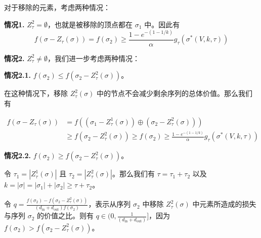 对于移除的元素，考虑两种情况：

\textbf{情况1.} $Z^2_{\tau}=\emptyset$，也就是被移除的顶点都在 $\sigma_1$ 中。因此有
\begin{equation}
    f(\sigma-Z_\tau(\sigma))=f(\sigma_2) \ge \frac{1-e^{-(1-1/k)}}{\alpha} g_\tau(\sigma^*(V,k,\tau))
\end{equation}

\textbf{情况2.} $Z^2_{\tau} \neq \emptyset$，我们进一步考虑两种情况：

\textbf{情况2.1.} $f(\sigma_2) \le f(\sigma_2 - Z^2_\tau(\sigma))$。

在这种情况下，移除 $Z^2_\tau(\sigma)$ 中的节点不会减少剩余序列的总体价值。那么我们有

\begin{align}
f(\sigma-Z_\tau(\sigma)) & = f((\sigma_1 - Z_\tau^1(\sigma)) \oplus (\sigma_2 - Z_\tau^2(\sigma))) \\
& \ge f(\sigma_2 -Z_\tau^2(\sigma)) \ge f(\sigma_2) \ge \frac{1-e^{-(1-1/k)}}{\alpha} g_\tau(\sigma^*(V,k,\tau))
\end{align}

\textbf{情况2.2.}  $f(\sigma_2) \ge f(\sigma_2 - Z^2_\tau(\sigma))$。

令 $\tau_1 = |Z_\tau^1(\sigma)|$ 且 $\tau_2=|Z_\tau^2(\sigma)|$。那么我们有 $\tau=\tau_1+\tau_2$ 以及 $k=|\sigma|=|\sigma_1|+|\sigma_2|\ge \tau+\tau_2$。

令 $q= \frac{f(\sigma_2)-f(\sigma_2-Z_\tau^2(\sigma))}{(d_{\text{in}}+d_{\text{out}})f(\sigma_2)}$，表示从序列 $\sigma_2$ 中移除 $Z_\tau^2(\sigma)$ 中元素所造成的损失与序列 $\sigma_2$ 的价值之比。则有 $q\in (0,\frac{1}{(d_{\text{in}}+d_{\text{out}})}]$，因为 $f(\sigma_2) > f(\sigma_2-Z_\tau^2(\sigma))$。


